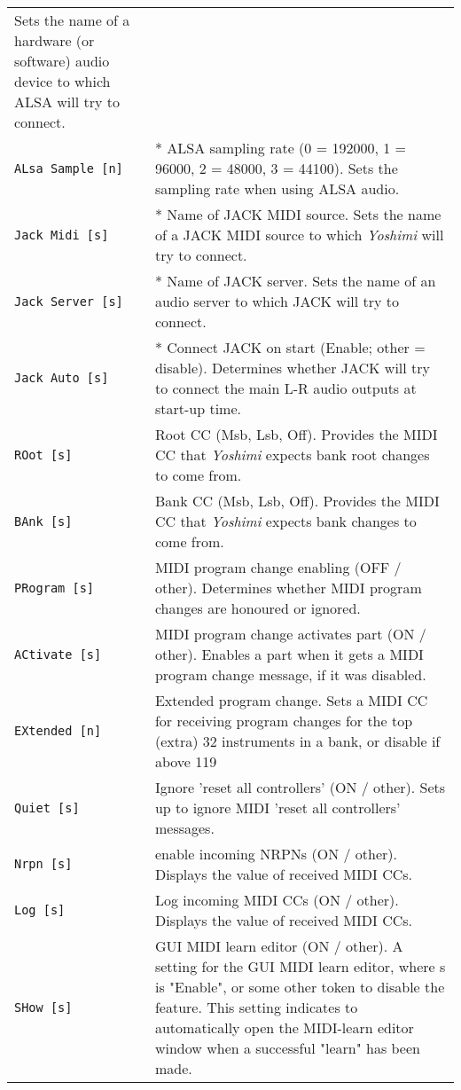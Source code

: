 \begin{center}
\begin{longtable}{p{4cm} p{10cm}}
   Sets the name of a hardware (or software)
   audio device to which ALSA will try to connect.  \\
\texttt{ALsa Sample [n]} &
   * ALSA sampling rate (0 = 192000, 1 = 96000, 2 = 48000, 3 = 44100).
   Sets the sampling rate when using ALSA audio. \\
\texttt{Jack Midi [s]} &
   * Name of JACK MIDI source.
   Sets the name of a JACK MIDI source to which
   \textsl{Yoshimi} will try to connect.  \\
\texttt{Jack Server [s]} &
   * Name of JACK server.
   Sets the name of an audio server to which JACK will try to connect. \\
\texttt{Jack Auto [s]} &
   * Connect JACK on start (Enable; other = disable).
   Determines whether JACK will try to connect the main L-R audio outputs at
   start-up time. \\
\texttt{ROot [s]} &
   Root CC (Msb, Lsb, Off).
   Provides the MIDI CC that \textsl{Yoshimi} expects bank root changes to
   come from.  \\
\texttt{BAnk [s]} &
   Bank CC (Msb, Lsb, Off).
   Provides the MIDI CC that \textsl{Yoshimi} expects
   bank changes to come from.  \\
\texttt{PRogram [s]} &
   MIDI program change enabling (OFF / other).
   Determines whether MIDI program changes are honoured or ignored.  \\
\texttt{ACtivate [s]} &
   MIDI program change activates part (ON / other).
   Enables a part when it gets a MIDI program change message,
   if it was disabled.  \\
\texttt{EXtended [n]} &
   Extended program change.
   Sets a MIDI CC for receiving program changes for the top (extra)
   32 instruments in a bank, or disable if above 119  \\
\texttt{Quiet [s]} &
   Ignore 'reset all controllers' (ON / other).
   Sets up to ignore MIDI 'reset all controllers' messages. \\
\texttt{Nrpn [s]} &
   enable incoming NRPNs (ON / other).
   Displays the value of received MIDI CCs. \\
\texttt{Log [s]} &
   Log incoming MIDI CCs (ON / other).
   Displays the value of received MIDI CCs. \\
\texttt{SHow [s]} &
   GUI MIDI learn editor (ON / other).
   A setting for the GUI MIDI learn editor, where s is "Enable", or some
   other token to disable the feature.
   This setting indicates to automatically open the MIDI-learn editor window
   when a successful "learn" has been made.  \\

\end{longtable}
\end{center}

